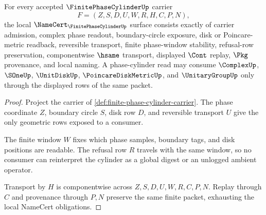 \begin{theorem}
\label{thm:finite-phase-cylinder-namecert-obligations}
For every accepted $\FinitePhaseCylinderUp$ carrier
$$
F=(Z,S,D,U,W,R,H,C,P,N),
$$
the local $\NameCert_{\FinitePhaseCylinderUp}$ surface consists exactly of carrier admission, complex phase readout, boundary-circle exposure, disk or Poincare-metric readback, reversible transport, finite phase-window stability, refusal-row preservation, componentwise $\hsame$ transport, displayed $\Cont$ replay, $\Pkg$ provenance, and local naming. A phase-cylinder read may consume $\ComplexUp$, $\SOneUp$, $\UnitDiskUp$, $\PoincareDiskMetricUp$, and $\UnitaryGroupUp$ only through the displayed rows of the same packet.
\end{theorem}
\begin{proof}
Project the carrier of \autoref{def:finite-phase-cylinder-carrier}. The phase coordinate $Z$, boundary circle $S$, disk row $D$, and reversible transport $U$ give the only geometric rows exposed to a consumer.

The finite window $W$ fixes which phase samples, boundary tags, and disk positions are readable. The refusal row $R$ travels with the same window, so no consumer can reinterpret the cylinder as a global digest or an unlogged ambient operator.

Transport by $H$ is componentwise across $Z,S,D,U,W,R,C,P,N$. Replay through $C$ and provenance through $P,N$ preserve the same finite packet, exhausting the local NameCert obligations.
\end{proof}




